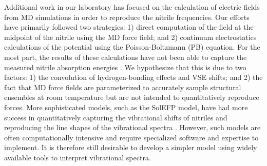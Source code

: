Additional work in our laboratory has focused on the calculation of electric fields from MD simulations in order to reproduce the nitrile frequencies. 
Our efforts have primarily followed two strategies: 
1) direct computation of the field at the midpoint of the nitrile using the MD force field; and 
2) continuum electrostatics calculations of the potential using the Poisson-Boltzmann (PB) equation. 
For the most part, the results of these calculations have not been able to capture the measured nitrile absorption energies \cite{Ritchie2013, Ritchie2014, Ritchie2015}. 
We hypothesize that this is due to two factors: 
1) the convolution of hydrogen-bonding effects and VSE shifts; and 
2) the fact that MD force fields are parameterized to accurately sample structural ensembles at room temperature but are not intended to quantitatively reproduce forces. 
More sophisticated models, such as the SolEFP model, have had more success in quantitatively capturing the vibrational shifts of nitriles and reproducing the line shapes of the vibrational spectra \cite{Blasiak2013, Blasiak2016}. 
However, such models are often computationally intensive and require specialized software and expertise to implement. 
It is therefore still desirable to develop a simpler model using widely available tools to interpret vibrational spectra. 

